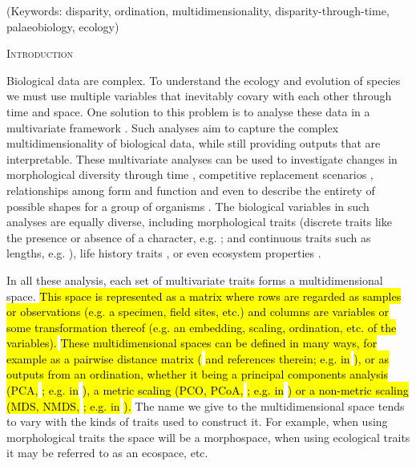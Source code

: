 \documentclass[12pt,letterpaper]{article}
\renewcommand{\section}[1]{%
\bigskip
\begin{center}
\begin{Large}
\normalfont\scshape #1
\medskip
\end{Large}
\end{center}}
\begin{document}
\noindent (Keywords: disparity, ordination, multidimensionality, disparity-through-time, palaeobiology, ecology)\\

\vspace{1.5in}

\newpage 

%
%

\section{Introduction}

Biological data are complex.
To understand the ecology and evolution of species we must use multiple variables that inevitably covary with each other through time and space.
One solution to this problem is to analyse these data in a multivariate framework \citep[e.g.][]{price2015predation,diaz2016global}.
Such analyses aim to capture the complex multidimensionality of biological data, while still providing outputs that are interpretable.
These multivariate analyses can be used to investigate changes in morphological diversity through time \citep[e.g][]{Close2015}, competitive replacement scenarios \citep[e.g.][]{Brusatte12092008}, relationships among form and function \citep[e.g.][]{diaz2016global} and even to describe the entirety of possible shapes for a group of organisms \citep[e.g.][]{raup1966geometric}.
The biological variables in such analyses are equally diverse, including morphological traits (discrete traits like the presence or absence of a character, e.g. \citealt{Close2015}; and continuous traits such as lengths, e.g. \citealt{price2015predation}), life history traits \citep[e.g.][]{diaz2016global}, or even ecosystem properties \citep[e.g.][]{DonohueDim}. 

In all these analysis, each set of multivariate traits forms a multidimensional space.
\hl{This space is represented as a matrix where rows are regarded as samples or observations (e.g. a specimen, field sites, etc.) and columns are variables or some transformation thereof (e.g. an embedding, scaling, ordination, etc. of the variables).}
\hl{These multidimensional spaces can be defined in many ways, for example as a pairwise distance matrix (}
\citealt{lloyd2016estimating}
\hl{and references therein; e.g. in}
\citealt{Close2015}
\hl{), or as outputs from an ordination, whether it being a principal components analysis (PCA,}
\citealt{PCA}
\hl{; e.g. in}
\citealt{zelditch2012geometric}
\hl{), a metric scaling (PCO, PCoA,}
\citealt{PCO}
\hl{; e.g. in}
\citealt{Brusatte12092008}
\hl{) or a non-metric scaling (MDS, NMDS,}
\citealt{MDS}
\hl{; e.g. in}
\citealt{Liow2004,DonohueDim}
\hl{).}
The name we give to the multidimensional space tends to vary with the kinds of traits used to construct it. 
For example, when using morphological traits the space will be a morphospace, when using ecological traits it may be referred to as an ecospace, etc.
\end{document}
